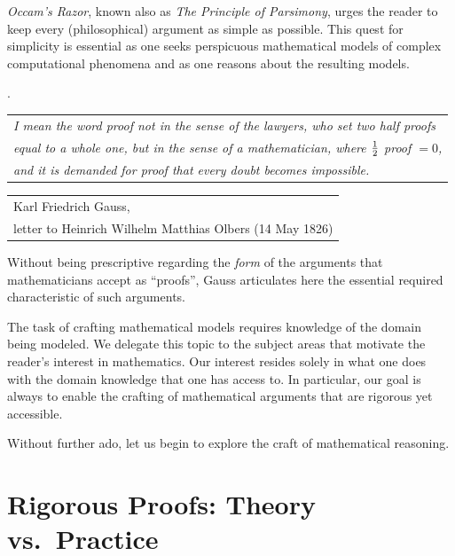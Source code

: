 \medskip

\noindent
{\it Occam's Razor}, known also as {\it The Principle of Parsimony}, urges the reader to keep every (philosophical) argument as simple as possible.  This quest for simplicity is essential as one seeks perspicuous mathematical models of complex computational phenomena and as one reasons about the resulting models.

\medskip

.

\smallskip

\noindent\hspace*{.1in}
\begin{tabular}{l}
{\it I mean the word proof not in the sense of the lawyers, who set two half proofs} \\
{\it equal to a whole one, but in the sense of a mathematician, where ${1 \over 2}$ proof $= 0$,} \\
{\it and it is demanded for proof that every doubt becomes impossible.}
\end{tabular}

\hfill {\small 
\begin{tabular}{l}
Karl Friedrich Gauss, \\
letter to Heinrich Wilhelm Matthias Olbers (14 May 1826)
\end{tabular} }

\medskip

\noindent
Without being prescriptive regarding the {\em form} of the arguments that mathematicians accept as ``proofs'', Gauss articulates here the essential required characteristic of such arguments.

\bigskip

The task of crafting mathematical models requires knowledge of the domain being modeled.  We delegate this topic to the subject areas that motivate the reader's interest in mathematics.  Our interest resides solely in what one does with the domain knowledge that one has access to.  In particular, our goal is always to enable the crafting of mathematical arguments that are rigorous yet accessible.

\medskip

Without further ado, let us begin to explore the craft of mathematical reasoning.

\section{Rigorous Proofs: Theory vs.~Practice}
\label{sec:reasoning-via-proofs}

